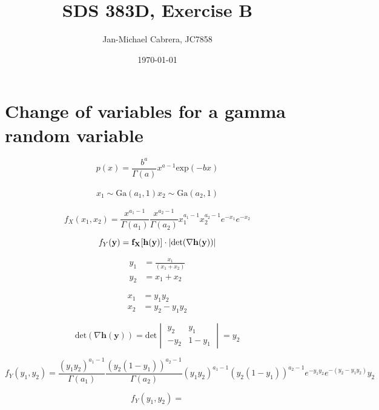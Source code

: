 \documentclass[12pt]{article}%
\begin{document}
      \title{SDS 383D, Exercise B}
      \author{Jan-Michael Cabrera, JC7858}
      \date{\today}
      \maketitle


      \section*{Change of variables for a gamma random variable}

            \begin{equation}\label{eq:gamma}
                  p(x) = \frac{b^a}{\Gamma(a)}x^{a-1} \text{exp}(-bx)
            \end{equation}

            \begin{align}
                  x_1 \sim \text{Ga}(a_1, 1)
                  x_2 \sim \text{Ga}(a_2, 1)
            \end{align}

            \begin{equation}\label{eq:x_joint}
                  f_X(x_1, x_2) = \frac{x^{a_1-1}}{\Gamma(a_1)}\frac{x^{a_2-1}}{\Gamma(a_2)}x_1^{a_1-1} x_2^{a_2-1} e^{-x_1}e^{-x_2}
            \end{equation}

            \begin{equation}\label{eq:change_variables}
                  f_Y(\bf{y}) = f_X[\bf{h(y)}]\cdot|\text{det}(\nabla h(y))|
            \end{equation}

            \begin{align}
                  y_1 &= \frac{x_1}{(x_1+x_2)} \\
                  y_2 &= x_1 + x_2
            \end{align}

            \begin{align}
                  x_1 &= y_1 y_2 \\
                  x_2 &= y_2 - y_1 y_2
            \end{align}

            \begin{equation}
                  \text{det}(\nabla \mathbf{h(y)}) = \text{det}
                  \begin{vmatrix}
                  y_2 & y_1 \\
                  -y_2 & 1-y_1
                  \end{vmatrix}
                  = y_2
            \end{equation}

            \begin{equation}
                  f_Y(y_1, y_2) = \frac{(y_1 y_2)^{a_1-1}}{\Gamma(a_1)}\frac{(y_2 (1-y_1))^{a_2-1}}{\Gamma(a_2)}(y_1 y_2)^{a_1-1} (y_2 (1-y_1))^{a_2-1} e^{-y_1 y_2}e^{-(y_2 - y_1 y_2)} y_2
            \end{equation}

            \begin{equation}
                  f_Y(y_1, y_2) = 
            \end{equation}
\end{document}
